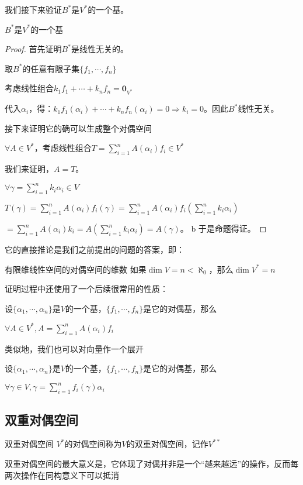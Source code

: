 \documentclass[12pt, a4paper, oneside, UTF8]{ctexbook}
\begin{document}
			我们接下来验证$B^*$是$V^*$的一个基。
			\begin{proposition}
				$B^*$是$V^*$的一个基
			\end{proposition}
			\begin{proof}
				首先证明$B^*$是线性无关的。

				取$B^*$的任意有限子集$\{f_1,\cdots,f_n\}$

				考虑线性组合$k_1 f_1 + \cdots+k_n f_n = \mathbf{0}_{V^*}$

				代入$\alpha_i$，得：$k_1 f_1(\alpha_i) + \cdots+k_n f_n(\alpha_i) = 0 \Rightarrow k_i = 0$。因此$B^*$线性无关。

				接下来证明它的确可以生成整个对偶空间

				$\forall A \in V^*$，考虑线性组合$T = \sum\limits_{i=1}^{n} A(\alpha_i) f_i \in V^*$

				我们来证明，$A=T$。

				$\forall \gamma = \sum\limits_{i=1}^{n} k_i \alpha_i \in V$

				$T(\gamma ) = \sum\limits_{i=1}^{n} A(\alpha_i) f_i(\gamma )=\sum\limits_{i=1}^{n} A(\alpha_i) f_i(\sum\limits_{i=1}^{n} k_i \alpha_i)$

				$= \sum\limits_{i=1}^{n} A(\alpha_i) k_i= A(\sum\limits_{i=1}^{n} k_i \alpha_i)=A(\gamma )$。
b    
				于是命题得证。
			\end{proof}
			它的直接推论是我们之前提出的问题的答案，即：
			\begin{corollary}{有限维线性空间的对偶空间的维数}{}
				如果$\dim V = n < \aleph_0$，那么$\dim V^* = n$
			\end{corollary}
			证明过程中还使用了一个后续很常用的性质：
			\begin{proposition}
				设$\{\alpha_1,\cdots,\alpha_n\}$是$V$的一个基，$\{f_1,\cdots,f_n\}$是它的对偶基，那么

				$\forall A \in V^*,A=\sum\limits_{i=1}^{n} A(\alpha_i) f_i$
			\end{proposition}
			类似地，我们也可以对向量作一个展开
			\begin{proposition}
				设$\{\alpha_1,\cdots,\alpha_n\}$是$V$的一个基，$\{f_1,\cdots,f_n\}$是它的对偶基，那么

				$\forall \gamma  \in V,\gamma  =\sum\limits_{i=1}^{n} f_i(\gamma )\alpha_i$
			\end{proposition}
		\subsection{双重对偶空间}
			\begin{defn}{双重对偶空间}{}
				$V^*$的对偶空间称为$V$的双重对偶空间，记作$V^{**}$
			\end{defn}
			双重对偶空间的最大意义是，它体现了对偶并非是一个“越来越远”的操作，反而每两次操作在同构意义下可以抵消
\end{document}
